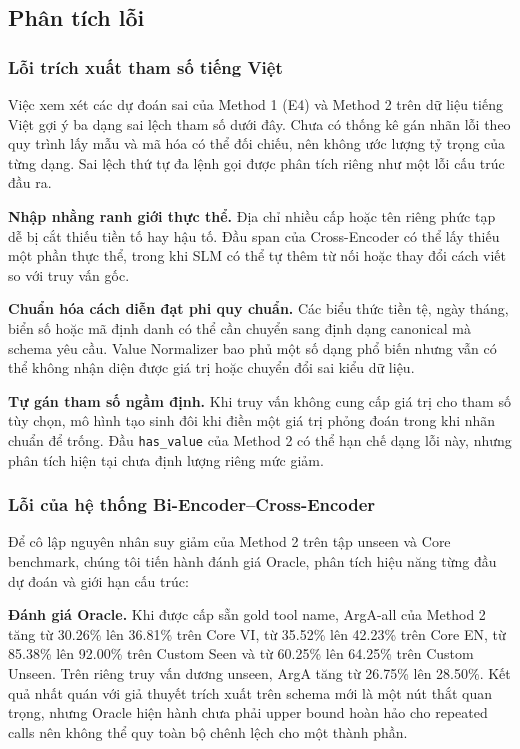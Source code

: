 \documentclass[10pt,twocolumn,a4paper]{article}
\begin{document}
\subsection{Phân tích lỗi}

\subsubsection{Lỗi trích xuất tham số tiếng Việt}
Việc xem xét các dự đoán sai của Method 1 (E4) và Method 2 trên dữ liệu tiếng Việt gợi ý ba dạng sai lệch tham số dưới đây. Chưa có thống kê gán nhãn lỗi theo quy trình lấy mẫu và mã hóa có thể đối chiếu, nên không ước lượng tỷ trọng của từng dạng. Sai lệch thứ tự đa lệnh gọi được phân tích riêng như một lỗi cấu trúc đầu ra.

\textbf{Nhập nhằng ranh giới thực thể.} Địa chỉ nhiều cấp hoặc tên riêng phức tạp dễ bị cắt thiếu tiền tố hay hậu tố. Đầu span của Cross-Encoder có thể lấy thiếu một phần thực thể, trong khi SLM có thể tự thêm từ nối hoặc thay đổi cách viết so với truy vấn gốc.

\textbf{Chuẩn hóa cách diễn đạt phi quy chuẩn.} Các biểu thức tiền tệ, ngày tháng, biển số hoặc mã định danh có thể cần chuyển sang định dạng canonical mà schema yêu cầu. Value Normalizer bao phủ một số dạng phổ biến nhưng vẫn có thể không nhận diện được giá trị hoặc chuyển đổi sai kiểu dữ liệu.

\textbf{Tự gán tham số ngầm định.} Khi truy vấn không cung cấp giá trị cho tham số tùy chọn, mô hình tạo sinh đôi khi điền một giá trị phỏng đoán trong khi nhãn chuẩn để trống. Đầu \texttt{has\_value} của Method 2 có thể hạn chế dạng lỗi này, nhưng phân tích hiện tại chưa định lượng riêng mức giảm.

\subsubsection{Lỗi của hệ thống Bi-Encoder--Cross-Encoder}
Để cô lập nguyên nhân suy giảm của Method 2 trên tập unseen và Core benchmark, chúng tôi tiến hành đánh giá Oracle, phân tích hiệu năng từng đầu dự đoán và giới hạn cấu trúc:

\textbf{Đánh giá Oracle.} Khi được cấp sẵn gold tool name, ArgA-all của Method 2 tăng từ 30.26\% lên 36.81\% trên Core VI, từ 35.52\% lên 42.23\% trên Core EN, từ 85.38\% lên 92.00\% trên Custom Seen và từ 60.25\% lên 64.25\% trên Custom Unseen. Trên riêng truy vấn dương unseen, ArgA tăng từ 26.75\% lên 28.50\%. Kết quả nhất quán với giả thuyết trích xuất trên schema mới là một nút thắt quan trọng, nhưng Oracle hiện hành chưa phải upper bound hoàn hảo cho repeated calls nên không thể quy toàn bộ chênh lệch cho một thành phần.
\end{document}
